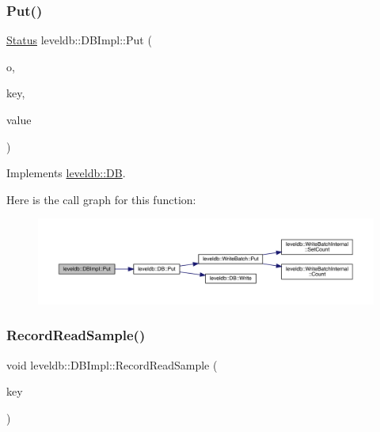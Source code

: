\subsubsection{\texorpdfstring{Put()}{Put()}}
{\footnotesize\ttfamily \mbox{\hyperlink{classleveldb_1_1_status}{Status}} leveldb\+::\+D\+B\+Impl\+::\+Put (\begin{DoxyParamCaption}\item[{const \mbox{\hyperlink{structleveldb_1_1_write_options}{Write\+Options}} \&}]{o,  }\item[{const \mbox{\hyperlink{classleveldb_1_1_slice}{Slice}} \&}]{key,  }\item[{const \mbox{\hyperlink{classleveldb_1_1_slice}{Slice}} \&}]{value }\end{DoxyParamCaption})\hspace{0.3cm}{\ttfamily [virtual]}}



Implements \mbox{\hyperlink{classleveldb_1_1_d_b_ac2e472812630ed74298df7b03b08c1ae}{leveldb\+::\+DB}}.

Here is the call graph for this function\+:
\nopagebreak
\begin{figure}[H]
\begin{center}
\leavevmode
\includegraphics[width=350pt]{classleveldb_1_1_d_b_impl_ad0d56aeb4d84ff9632c9a7f3f1b7c4d5_cgraph}
\end{center}
\end{figure}
\mbox{\label{classleveldb_1_1_d_b_impl_a254ae98e3425046c28ed0aa6d78b37d8}} 
\subsubsection{\texorpdfstring{RecordReadSample()}{RecordReadSample()}}
{\footnotesize\ttfamily void leveldb\+::\+D\+B\+Impl\+::\+Record\+Read\+Sample (\begin{DoxyParamCaption}\item[{\mbox{\hyperlink{classleveldb_1_1_slice}{Slice}}}]{key }\end{DoxyParamCaption})}

